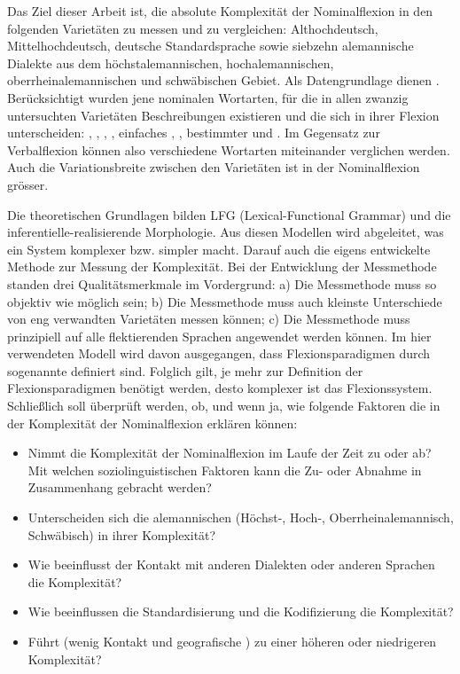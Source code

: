 Das Ziel dieser Arbeit ist, die absolute Komplexität der Nominalflexion in den folgenden Varietäten zu messen und zu vergleichen: Althochdeutsch, Mittelhochdeutsch, deutsche Standardsprache sowie siebzehn alemannische Dialekte aus dem höchstalemannischen, hochalemannischen, oberrheinalemannischen und schwäbischen Gebiet. Als Datengrundlage dienen . Berücksichtigt wurden jene nominalen Wortarten, für die in allen zwanzig untersuchten Varietäten Beschreibungen existieren und die sich in ihrer Flexion unterscheiden: , , , , einfaches , , bestimmter und . Im Gegensatz zur Verbalflexion können also verschiedene Wortarten miteinander verglichen werden. Auch die Variationsbreite zwischen den Varietäten ist in der Nominalflexion grösser.

Die theoretischen Grundlagen bilden LFG (Lexical-Functional Grammar) und die in\-fe\-ren\-tiel\-le-re\-a\-li\-sie\-ren\-de Morphologie. Aus diesen Modellen wird abgeleitet, was ein System komplexer bzw. simpler macht. Darauf auch die eigens entwickelte Methode zur Messung der Komplexität. Bei der Entwicklung der Messmethode standen drei Qualitätsmerkmale im Vordergrund: a) Die Messmethode muss so objektiv wie möglich sein; b) Die Messmethode muss auch kleinste Unterschiede von eng verwandten Varietäten messen können; c) Die Messmethode muss prinzipiell auf alle flektierenden Sprachen angewendet werden können. Im hier verwendeten Modell wird davon ausgegangen, dass Flexionsparadigmen durch sogenannte  definiert sind. Folglich gilt, je mehr  zur Definition der Flexionsparadigmen benötigt werden, desto komplexer ist das Flexionssystem. Schließlich soll überprüft werden, ob, und wenn ja, wie folgende Faktoren die  in der Komplexität der Nominalflexion erklären können:

\begin{itemize}
\item 
Nimmt die Komplexität der Nominalflexion im Laufe der Zeit zu oder ab? Mit welchen soziolinguistischen Faktoren kann die Zu- oder Abnahme in Zusammenhang gebracht werden?
\item 
Unterscheiden sich die alemannischen  (Höchst-, Hoch-, Oberrheinalemannisch, Schwäbisch) in ihrer Komplexität?
\item 
Wie beeinflusst der Kontakt mit anderen Dialekten oder anderen Sprachen die Komplexität?
\item 
Wie beeinflussen die Standardisierung und die Kodifizierung die Komplexität?
\item 
Führt  (wenig Kontakt und geografische ) zu einer höheren oder niedrigeren Komplexität?
\end{itemize}

